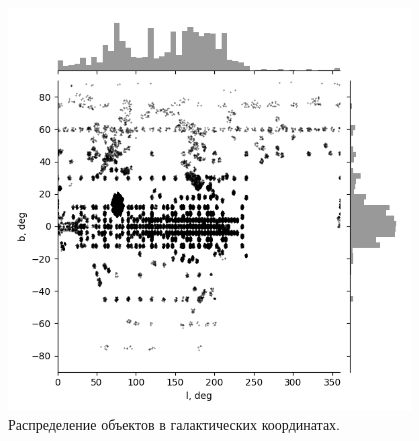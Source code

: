\documentclass{matmex-diploma-custom}
\begin{document}
\pagebreak

\begin{figure}[h!]
\caption{Распределение объектов в галактических координатах.}
\begin{minipage}[h]{1.0\linewidth}
        \includegraphics[width=0.95\textwidth]{../imgs/lb.png}
\end{minipage}
\end{figure}

\pagebreak
\end{document}
